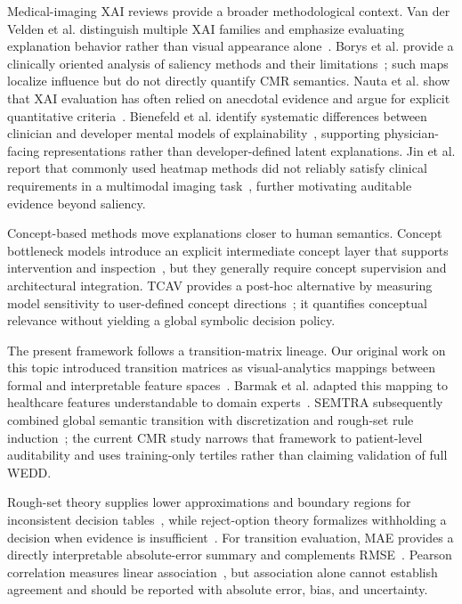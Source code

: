 \documentclass{ceurart}
\begin{document}
Medical-imaging XAI reviews provide a broader methodological context. Van der Velden et al. distinguish multiple XAI families and emphasize evaluating explanation behavior rather than visual appearance alone~\cite{VanDerVelden2022Explainable}. Borys et al. provide a clinically oriented analysis of saliency methods and their limitations~\cite{Borys2023Explainable}; such maps localize influence but do not directly quantify CMR semantics. Nauta et al. show that XAI evaluation has often relied on anecdotal evidence and argue for explicit quantitative criteria~\cite{Nauta2023Anecdotal}. Bienefeld et al. identify systematic differences between clinician and developer mental models of explainability~\cite{Bienefeld2023XAIConundrum}, supporting physician-facing representations rather than developer-defined latent explanations. Jin et al. report that commonly used heatmap methods did not reliably satisfy clinical requirements in a multimodal imaging task~\cite{Jin2022MultimodalXAI}, further motivating auditable evidence beyond saliency.

Concept-based methods move explanations closer to human semantics. Concept bottleneck models introduce an explicit intermediate concept layer that supports intervention and inspection~\cite{Koh2020Concept}, but they generally require concept supervision and architectural integration. TCAV provides a post-hoc alternative by measuring model sensitivity to user-defined concept directions~\cite{Kim2018TCAV}; it quantifies conceptual relevance without yielding a global symbolic decision policy.

The present framework follows a transition-matrix lineage. Our original work on this topic introduced transition matrices as visual-analytics mappings between formal and interpretable feature spaces~\cite{Radiuk2024Explainable}. Barmak et al. adapted this mapping to healthcare features understandable to domain experts~\cite{Barmak2024Toward}. SEMTRA subsequently combined global semantic transition with discretization and rough-set rule induction~\cite{Radiuk2026SEMTRA}; the current CMR study narrows that framework to patient-level auditability and uses training-only tertiles rather than claiming validation of full WEDD.

Rough-set theory supplies lower approximations and boundary regions for inconsistent decision tables~\cite{Pawlak1982Rough}, while reject-option theory formalizes withholding a decision when evidence is insufficient~\cite{Chow1970Optimum}. For transition evaluation, MAE provides a directly interpretable absolute-error summary and complements RMSE~\cite{Willmott2005Advantages}. Pearson correlation measures linear association~\cite{Benesty2009Pearson}, but association alone cannot establish agreement and should be reported with absolute error, bias, and uncertainty.
\end{document}
